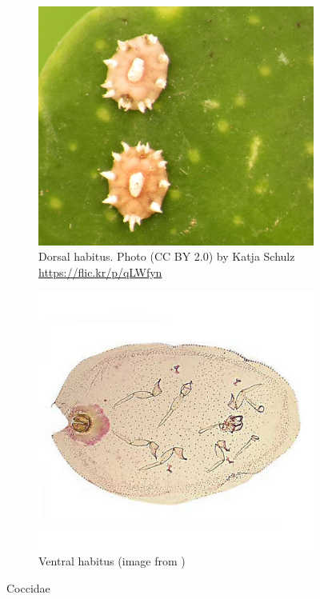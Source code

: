 \documentclass[letterpaper, 11pt]{article}
\begin{document}
\begin{figure}[ht!]
 \centering
 \begin{subfigure}[ht!]{0.45\textwidth}
  \includegraphics[width=\textwidth]{CoccidDorsalHabitus}
  \caption{Dorsal habitus. Photo (CC BY 2.0) by Katja Schulz \url{https://flic.kr/p/qLWfyn}}
  \label{fig:coccid1}
 \end{subfigure}
 \qquad
 \begin{subfigure}[ht!]{0.45\textwidth}
  \includegraphics[width=\textwidth]{CoccidHabitus}
  \caption{Ventral habitus (image from \cite{ScaleNet})}
  \label{fig:coccid2}
 \end{subfigure}
 \caption{Coccidae}\label{fig:coccid}
\end{figure}
\end{document}
